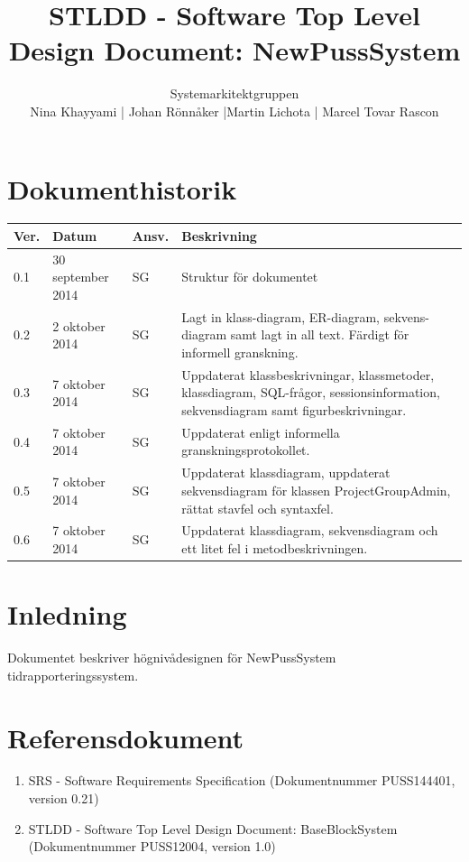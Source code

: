 \documentclass[a4paper]{article}
\title{STLDD - Software Top Level Design Document: NewPussSystem}
\author{Systemarkitektgruppen \\ Nina Khayyami | Johan Rönnåker |Martin Lichota | Marcel Tovar Rascon}
\date{}
\begin{document}
\maketitle
\thispagestyle{fancy}
\tableofcontents
\newpage

\section*{Dokumenthistorik}

\begin{tabular}{ l l l p{8.5cm} }
Ver. & Datum & Ansv. & Beskrivning \\\hline
0.1 & 30 september 2014 & SG & Struktur för dokumentet\\
0.2 & 2 oktober 2014 & SG & Lagt in klass-diagram, ER-diagram, sekvens-diagram samt lagt in all text. Färdigt för informell granskning.\\
0.3 & 7 oktober 2014 & SG & Uppdaterat klassbeskrivningar, klassmetoder, klassdiagram, SQL-frågor, sessionsinformation, sekvensdiagram samt figurbeskrivningar.\\
0.4 & 7 oktober 2014 & SG & Uppdaterat enligt informella granskningsprotokollet.\\
0.5 & 7 oktober 2014 & SG & Uppdaterat klassdiagram, uppdaterat sekvensdiagram för klassen ProjectGroupAdmin, rättat stavfel och syntaxfel.\\
0.6 & 7 oktober 2014 & SG & Uppdaterat klassdiagram, sekvensdiagram och ett litet fel i metodbeskrivningen. 

\end{tabular}
\newpage
\section{Inledning}       
Dokumentet beskriver högnivådesignen för NewPussSystem tidrapporteringssystem.



\section{Referensdokument}
\begin{enumerate}
\item SRS - Software Requirements Specification (Dokumentnummer PUSS144401, version 0.21)
\item STLDD - Software Top Level Design Document: BaseBlockSystem (Dokumentnummer PUSS12004, version 1.0)
\end{enumerate}
\end{document}
